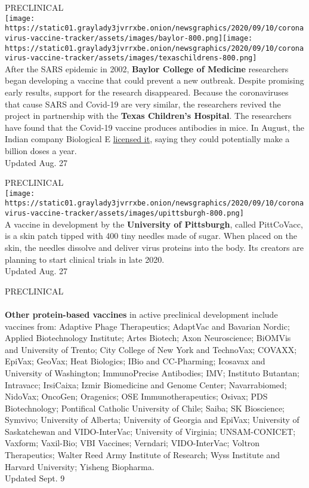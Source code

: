 PRECLINICAL\\
\texttt{[image: https://static01.graylady3jvrrxbe.onion/newsgraphics/2020/09/10/coronavirus-vaccine-tracker/assets/images/baylor-800.png]}\texttt{[image: https://static01.graylady3jvrrxbe.onion/newsgraphics/2020/09/10/coronavirus-vaccine-tracker/assets/images/texaschildrens-800.png]}\\
After the SARS epidemic in 2002, \textbf{\textbf{Baylor College of
Medicine}} researchers began developing a vaccine that could prevent a
new outbreak. Despite promising early results, support for the research
disappeared. Because the coronaviruses that cause SARS and Covid-19 are
very similar, the researchers revived the project in partnership with
the \textbf{\textbf{Texas Children's Hospital}}. The researchers have
found that the Covid-19 vaccine produces antibodies in mice. In August,
the Indian company Biological E
\href{http://www.biologicale.com/news.html}{licensed it}, saying they
could potentially make a billion doses a year.\\
Updated Aug. 27

PRECLINICAL\\
\texttt{[image: https://static01.graylady3jvrrxbe.onion/newsgraphics/2020/09/10/coronavirus-vaccine-tracker/assets/images/upittsburgh-800.png]}\\
A vaccine in development by the \textbf{\textbf{University of
Pittsburgh}}, called PittCoVacc, is a skin patch tipped with 400 tiny
needles made of sugar. When placed on the skin, the needles dissolve and
deliver virus proteins into the body. Its creators are planning to start
clinical trials in late 2020.\\
Updated Aug. 27

PRECLINICAL\\
~\\
 \textbf{\textbf{Other protein-based vaccines}} in active preclinical
development include vaccines from: Adaptive Phage Therapeutics; AdaptVac
and Bavarian Nordic; Applied Biotechnology Institute; Artes Biotech;
Axon Neuroscience; BiOMVis and University of Trento; City College of New
York and TechnoVax; COVAXX; EpiVax; GeoVax; Heat Biologics; IBio and
CC-Pharming; Icosavax and University of Washington; ImmunoPrecise
Antibodies; IMV; Instituto Butantan; Intravacc; IrsiCaixa; Izmir
Biomedicine and Genome Center; Navarrabiomed; NidoVax; OncoGen;
Oragenics; OSE Immunotherapeutics; Osivax; PDS Biotechnology; Pontifical
Catholic University of Chile; Saiba; SK Bioscience; Symvivo; University
of Alberta; University of Georgia and EpiVax; University of Saskatchewan
and VIDO-InterVac; University of Virginia; UNSAM-CONICET; Vaxform;
Vaxil-Bio; VBI Vaccines; Verndari; VIDO-InterVac; Voltron Therapeutics;
Walter Reed Army Institute of Research; Wyss Institute and Harvard
University; Yisheng Biopharma.\\
Updated Sept. 9

